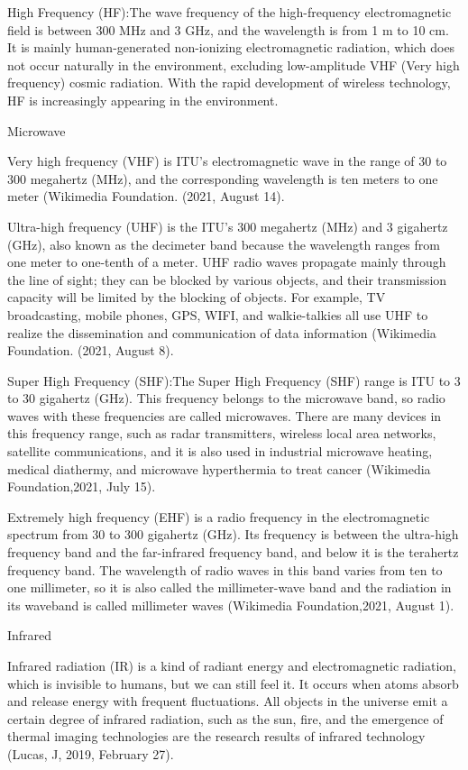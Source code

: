 \documentclass[conference]{IEEEtran}
\newcommand{\subparagraph}{}
\begin{document}
High Frequency (HF):The wave frequency of the high-frequency electromagnetic field is between 300 MHz and 3 GHz, and the 
wavelength is from 1 m to 10 cm. It is mainly human-generated non-ionizing electromagnetic radiation, which does not occur 
naturally in the environment, excluding low-amplitude VHF (Very high frequency) cosmic radiation. With the rapid development 
of wireless technology, HF is increasingly appearing in the environment.

\subparagraph{Microwave}

Very high frequency (VHF) is ITU's electromagnetic wave in the range of 30 to 300 megahertz (MHz), and the corresponding 
wavelength is ten meters to one meter (Wikimedia Foundation. (2021, August 14).

Ultra-high frequency (UHF) is the ITU's 300 megahertz (MHz) and 3 gigahertz (GHz), also known as the decimeter band because 
the wavelength ranges from one meter to one-tenth of a meter. UHF radio waves propagate mainly through the line of sight; 
they can be blocked by various objects, and their transmission capacity will be limited by the blocking of objects. For example, 
TV broadcasting, mobile phones, GPS, WIFI, and walkie-talkies all use UHF to realize the dissemination and communication of data 
information (Wikimedia Foundation. (2021, August 8).

Super High Frequency (SHF):The Super High Frequency (SHF) range is ITU to 3 to 30 gigahertz (GHz). This frequency belongs to 
the microwave band, so radio waves with these frequencies are called microwaves. There are many devices in this frequency range, 
such as radar transmitters, wireless local area networks, satellite communications, and it is also used in industrial microwave 
heating, medical diathermy, and microwave hyperthermia to treat cancer (Wikimedia Foundation,2021, July 15).

Extremely high frequency (EHF) is a radio frequency in the electromagnetic spectrum from 30 to 300 gigahertz (GHz). Its frequency 
is between the ultra-high frequency band and the far-infrared frequency band, and below it is the terahertz frequency band. The 
wavelength of radio waves in this band varies from ten to one millimeter, so it is also called the millimeter-wave band and the 
radiation in its waveband is called millimeter waves (Wikimedia Foundation,2021, August 1).

\subparagraph{Infrared}

 Infrared radiation (IR) is a kind of radiant energy and electromagnetic radiation, which is invisible to humans, but we can 
 still feel it. It occurs when atoms absorb and release energy with frequent fluctuations. All objects in the universe emit a 
 certain degree of infrared radiation, such as the sun, fire, and the emergence of thermal imaging technologies are the research 
 results of infrared technology (Lucas, J, 2019, February 27).
\end{document}
